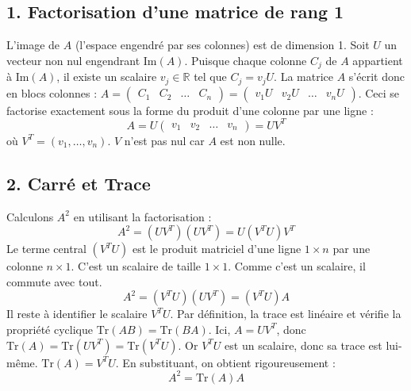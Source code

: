 \documentclass[11pt,a4paper]{article}
\begin{document}
\subsection{1. Factorisation d'une matrice de rang 1}
L'image de $A$ (l'espace engendré par ses colonnes) est de dimension 1. Soit $U$ un vecteur non nul engendrant $\text{Im}(A)$.
Puisque chaque colonne $C_j$ de $A$ appartient à $\text{Im}(A)$, il existe un scalaire $v_j \in \mathbb{R}$ tel que $C_j = v_j U$.
La matrice $A$ s'écrit donc en blocs colonnes : $A = \begin{pmatrix} C_1 & C_2 & \dots & C_n \end{pmatrix} = \begin{pmatrix} v_1 U & v_2 U & \dots & v_n U \end{pmatrix}$.
Ceci se factorise exactement sous la forme du produit d'une colonne par une ligne :
$$A = U \begin{pmatrix} v_1 & v_2 & \dots & v_n \end{pmatrix} = U V^T$$
où $V^T = (v_1, \dots, v_n)$. $V$ n'est pas nul car $A$ est non nulle.

\subsection{2. Carré et Trace}
Calculons $A^2$ en utilisant la factorisation :
$$A^2 = (U V^T)(U V^T) = U (V^T U) V^T$$
Le terme central $(V^T U)$ est le produit matriciel d'une ligne $1 \times n$ par une colonne $n \times 1$. C'est un scalaire de taille $1 \times 1$. Comme c'est un scalaire, il commute avec tout.
$$A^2 = (V^T U) (U V^T) = (V^T U) A$$
Il reste à identifier le scalaire $V^T U$.
Par définition, la trace est linéaire et vérifie la propriété cyclique $\text{Tr}(AB) = \text{Tr}(BA)$.
Ici, $A = U V^T$, donc $\text{Tr}(A) = \text{Tr}(U V^T) = \text{Tr}(V^T U)$.
Or $V^T U$ est un scalaire, donc sa trace est lui-même. $\text{Tr}(A) = V^T U$.
En substituant, on obtient rigoureusement :
$$A^2 = \text{Tr}(A) A$$
\end{document}
